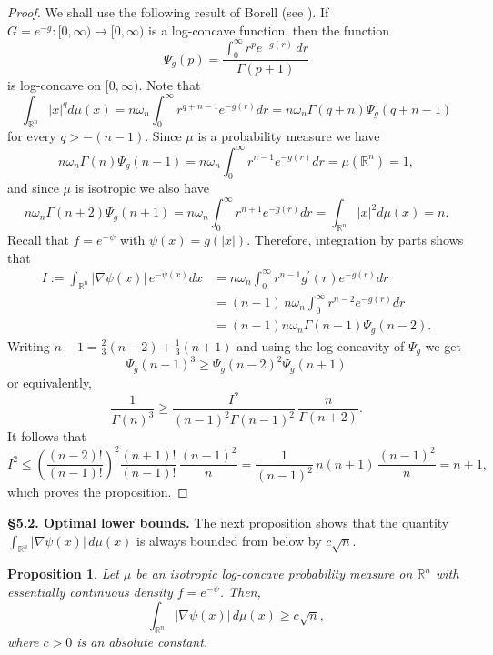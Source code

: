 \documentclass[11pt,leqno]{article}
\newtheorem{proposition}[theorem]{Proposition}
\theoremstyle{definition}
\theoremstyle{remark}
\numberwithin{equation}{section}
\newcommand{\ls}{\leqslant}
\newcommand{\gr}{\geqslant}
\newcommand{\1}{\textbf{1}}
\begin{document}
\begin{proof}We shall use the following result of Borell (see \cite[Theorem~2.2.5]{BGVV-book}). If $G=e^{-g}:[0,\infty)\to [0,\infty)$ is a log-concave function, 
then the function
$$\Psi_g(p)=\frac{\int_0^{\infty}r^pe^{-g(r)}\,dr}{\Gamma(p+1)}$$
is log-concave on $[0,\infty)$. 
Note that
$$\int_{\mathbb{R}^n}|x|^qd\mu(x)=n\omega_n\int_0^{\infty}r^{q+n-1}e^{-g(r)}dr = n\omega_n \Gamma(q+n) \Psi_g(q+n-1)$$
for every $q>-(n-1)$. Since $\mu$ is a probability measure we have 
$$n\omega_n\Gamma(n)\Psi_g(n-1)=n\omega_n\int_0^{\infty}r^{n-1}e^{-g(r)}dr=\mu(\mathbb{R}^n)=1,$$ 
and since $\mu$ is isotropic we also have 
$$n\omega_n\Gamma(n+2)\Psi_g(n+1)=n\omega_n\int_0^{\infty}r^{n+1}e^{-g(r)}dr=\int_{\mathbb{R}^n}|x|^2d\mu(x)=n.$$
Recall that $f=e^{-\psi}$ with $\psi(x)=g(|x|)$. Therefore, integration by parts shows that
\begin{align*}
I:=\int_{\mathbb{R}^n}|\nabla \psi(x)|\,e^{-\psi(x)}dx &=n\omega_n\int_0^{\infty}r^{n-1}g^{\prime}(r)e^{-g(r)}dr\\
&=(n-1)\,n\omega_n\int_0^{\infty}r^{n-2}e^{-g(r)}dr\\
&=(n-1)n\omega_n\Gamma(n-1)\Psi_g(n-2).
\end{align*}
Writing $n-1=\frac{2}{3}(n-2)+\frac{1}{3}(n+1)$ and using the log-concavity of $\Psi_g$ we get
$$\Psi_g(n-1)^3\gr \Psi_g(n-2)^2\Psi_g(n+1)$$
or equivalently,
$$\frac{1}{\Gamma(n)^3}\gr\frac{I^2}{(n-1)^2\Gamma(n-1)^2}\,\frac{n}{\Gamma(n+2)}.$$
It follows that
$$I^2\ls \left(\frac{(n-2)!}{(n-1)!}\right)^2\frac{(n+1)!}{(n-1)!}\,\frac{(n-1)^2}{n}
=\frac{1}{(n-1)^2}\,n(n+1)\,\frac{(n-1)^2}{n}=n+1,$$ 
which proves the proposition. \end{proof}


\bigskip 

\noindent \textbf{\S 5.2. Optimal lower bounds.} The next proposition shows that the quantity $\int_{\mathbb{R}^n}|\nabla\psi(x)|\,d\mu(x)$ is always bounded from below by $c\sqrt{n}$.

\begin{proposition}\label{th:root-of-n}
Let $\mu$ be an isotropic log-concave probability measure on $\mathbb{R}^n$ with essentially continuous density $f=e^{-\psi}$. 
Then,
$$\int_{\mathbb{R}^n} |\nabla \psi(x)|\,d\mu(x) \gr c\sqrt{n},$$
where $c>0$ is an absolute constant.
\end{proposition}
\end{document}

